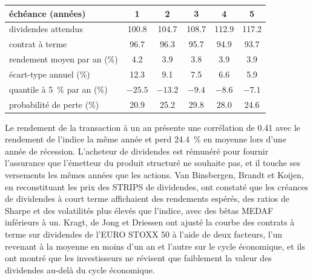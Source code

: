 \begin{center}
\small
\begin{tabular}{@{}lccccc@{}}
\toprule
échéance (années) & 1 & 2 & 3 & 4 & 5\\
\midrule
dividendes attendus & 100.8 & 104.7 & 108.7 & 112.9 & 117.2\\
contrat à terme & 96.7 & 96.3 & 95.7 & 94.9 & 93.7\\
rendement moyen par an (\%) & 4.2 & 3.9 & 3.8 & 3.9 & 3.9\\
écart-type annuel (\%) & 12.3 & 9.1 & 7.5 & 6.6 & 5.9\\
quantile à 5~\% par an (\%) & $-25.5$ & $-13.2$ & $-9.4$ & $-8.6$ & $-7.1$\\
probabilité de perte (\%) & 20.9 & 25.2 & 29.8 & 28.0 & 24.6\\
\bottomrule
\end{tabular}
\end{center}

Le rendement de la transaction à un an présente une corrélation de 0.41 avec le rendement de l'indice la même année et perd 24.4~\% en moyenne lors d'une année de récession.
L'acheteur de dividendes est rémunéré pour fournir l'assurance que l'émetteur du produit structuré ne souhaite pas, et il touche ses versements les mêmes années que les actions.
Van Binsbergen, Brandt et Koijen, en reconstituant les prix des STRIPS de dividendes, ont constaté que les créances de dividendes à court terme affichaient des rendements espérés, des
ratios de Sharpe et des volatilités plus élevés que l'indice, avec des bêtas MEDAF inférieurs à un. Kragt, de Jong et Driessen ont ajusté la courbe des contrats à terme sur dividendes de l'EURO STOXX 50 à l'aide de deux
facteurs, l'un revenant à la moyenne en moins d'un an et l'autre sur le cycle économique, et ils ont montré que les investisseurs ne révisent que
faiblement la valeur des dividendes au-delà du cycle économique.

\begin{omfigure}

\label{fig:s2:delta-one-and-dividends:dividends}
\end{omfigure}

